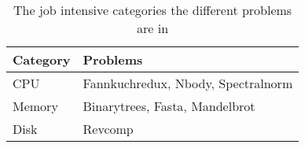 \begin{table}[h]
\centering
\begin{tabular}{|l|l|}
\hline
\textbf{Category} & \textbf{Problems}                           \\ \hline
CPU      & Fannkuchredux, Nbody, Spectralnorm \\ \hline
Memory   & Binarytrees, Fasta, Mandelbrot     \\ \hline
Disk     & Revcomp                            \\ \hline
\end{tabular}
\caption{The job intensive categories the different problems are in}
\label{tab:problems}
\end{table}




